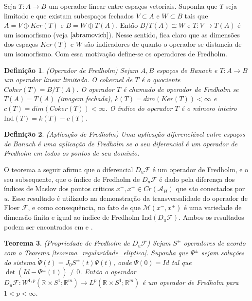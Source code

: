 \documentclass[12pt]{book}
\newtheorem{teorema}{Teorema}[section]
\newtheorem{definicao}[teorema]{Definição}
\newcommand{\circulo}{S^{1}}
\newcommand{\diferencialfloerponto}[1]{D_{#1}\operadorFloer}
\newcommand{\energiafinitaM}{\mathcal{M}}
\newcommand{\energiafinitaMconectante}{\energiafinitaM(x^{-}, x^{+})}
\newcommand{\espacoLpcontradominio}[2]{L^{p}(#1;#2)}
\newcommand{\espacosobolevcontradominio}[2]{W^{1,p}(#1;#2)}
\newcommand{\estruturacomplexa}{J_{0}}
\newcommand{\funcionalH}{\mathcal{A}_{H}}
\newcommand{\ind}{\text{Ind}}
\newcommand{\operadorFloer}{\mathcal{F}}
\newcommand{\pontoscriticos}[1]{\textit{Cr}(#1)}
\newcommand{\retacartesianocirculo}{\real{} \times \circulo}
\newcommand{\real}[1]{\mathbb{R}^{#1}}
\begin{document}
	Seja $T:A\to B$ um operador linear entre espaços vetoriais. Suponha que $T$ seja limitado e que existam subespaços fechados $V \subset A$ e $W \subset B$ tais que $A=V\oplus Ker(T)$ e $B=W\oplus T(A)$. Então $B/T(A) \cong W$ e $T:V \to T(A)$ é um isomorfismo (veja $\cite{abramovich}$). Nesse sentido, fica claro que as dimensões dos espaços $Ker(T)$ e $W$ são indicadores de quanto o operador se distancia de um isomorfismo. Com essa motivação define-se os operadores de Fredholm.
	
	\begin{definicao}\label{definicao_operador_fredholm}
		(Operador de Fredholm) Sejam $A, B$ espaços de Banach e $T: A\to B$ um operador linear limitado. O cokernel de $T$ é o quociente $Coker(T)=B/T(A)$. O operador $T$ é chamado de operador de Fredholm se $T(A)=\overline{T(A)}$ (imagem fechada), $k(T) = dim(Ker(T)) < \infty$ e $c(T)=dim(Coker(T)) < \infty$. O índice do operador $T$ é o número inteiro $\ind(T) = k(T) - c(T)$. 
	\end{definicao}
	
	\begin{definicao}
		(Aplicação de Fredholm) Uma aplicação diferenciável entre espaços de Banach é uma aplicação de Fredholm se o seu diferencial é um operador de Fredholm em todos os pontos de seu domínio.
	\end{definicao}
	
	
	O teorema a seguir afirma que o diferencial $\diferencialfloerponto{u}$ é um operador de Fredholm, e o seu subsequente, que o índice de Fredholm de $\diferencialfloerponto{u}$ é dado pela diferença dos índices de Maslov dos pontos críticos $x^{-}, x^{+} \in \pontoscriticos{\funcionalH}$ que são conectados por $u$. Esse resultado é utilizado na demonstração da transversalidade do operador de Floer $\operadorFloer$, e como consequência, no fato de que $\energiafinitaMconectante$ é uma variedade de dimensão finita e igual ao índice de Fredholm $\ind(\diferencialfloerponto{u})$. Ambos os resultados podem ser encontrados em \cite{audi_floer_homology} e \cite{salamon_zehnder}.
	
	\begin{teorema}\label{teorema_propriedade_fredholm}
		(Propriedade de Fredholm de $\diferencialfloerponto{u}$) Sejam $S^{\pm}$ operadores de acordo com o Teorema \ref{teorema_regularidade_eliptica}. Suponha que $\Psi^{\pm}$ sejam soluções do sistema $\dot{\Psi}(t) = \estruturacomplexa S^{\pm}(t)\Psi(t)$, onde $\Psi(0)=Id$ tal que $\det(Id-\Psi^{\pm}(1))\neq 0$. Então o operador $\diferencialfloerponto{u}: \espacosobolevcontradominio{\retacartesianocirculo}{\real{m}}\to \espacoLpcontradominio{\retacartesianocirculo}{\real{m}}$ é um operador de Fredholm para $1<p<\infty$.
	\end{teorema}
	
\end{document}
